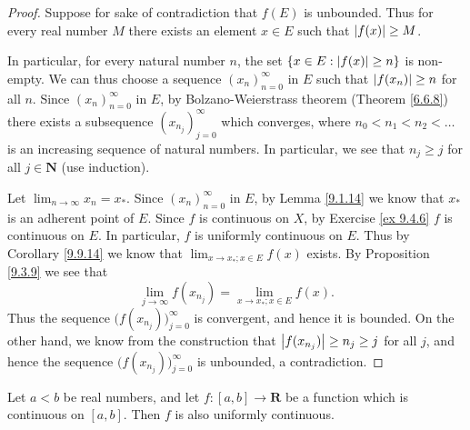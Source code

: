 \begin{proof}
    Suppose for sake of contradiction that \(f(E)\) is unbounded.
    Thus for every real number \(M\) there exists an element \(x \in E\) such that \(\abs*{f(x)} \geq M\).

    In particular, for every natural number \(n\), the set \(\{x \in E : \abs*{f(x)} \geq n\}\) is non-empty.
    We can thus choose a sequence \((x_n)_{n = 0}^\infty\) in \(E\) such that \(\abs*{f(x_n)} \geq n\) for all \(n\).
    Since \((x_n)_{n = 0}^\infty\) in \(E\), by Bolzano-Weierstrass theorem (Theorem \ref{6.6.8}) there exists a subsequence \((x_{n_j})_{j = 0}^\infty\) which converges, where \(n_0 < n_1 < n_2 < \dots\) is an increasing sequence of natural numbers.
    In particular, we see that \(n_j \geq j\) for all \(j \in \mathbf{N}\) (use induction).

    Let \(\lim_{n \to \infty} x_n = x_*\).
    Since \((x_n)_{n = 0}^\infty\) in \(E\), by Lemma \ref{9.1.14} we know that \(x_*\) is an adherent point of \(E\).
    Since \(f\) is continuous on \(X\), by Exercise \ref{ex 9.4.6} \(f\) is continuous on \(E\).
    In particular, \(f\) is uniformly continuous on \(E\).
    Thus by Corollary \ref{9.9.14} we know that \(\lim_{x \to x_* ; x \in E} f(x)\) exists.
    By Proposition \ref{9.3.9} we see that
    \[
        \lim_{j \to \infty} f(x_{n_j}) = \lim_{x \to x_* ; x \in E} f(x).
    \]
    Thus the sequence \(\big(f(x_{n_j})\big)_{j = 0}^\infty\) is convergent, and hence it is bounded.
    On the other hand, we know from the construction that \(\abs*{f(x_{n_j})} \geq n_j \geq j\) for all \(j\), and hence the sequence \(\big(f(x_{n_j})\big)_{j = 0}^\infty\) is unbounded, a contradiction.
\end{proof}

\begin{theorem}\label{9.9.16}
    Let \(a < b\) be real numbers, and let \(f : [a, b] \to \mathbf{R}\) be a function which is continuous on \([a, b]\).
    Then \(f\) is also uniformly continuous.
\end{theorem}

